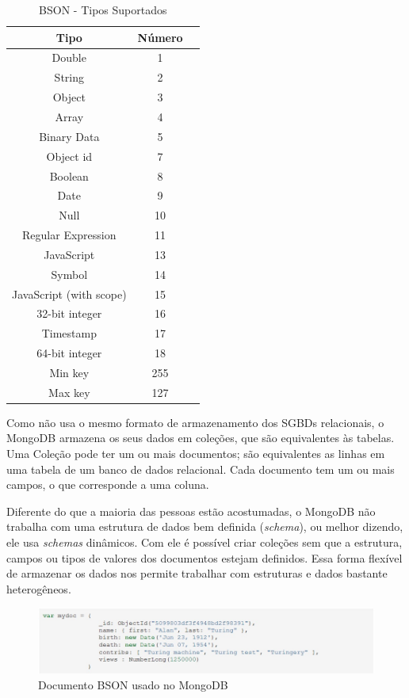 \begin{table}
	\caption{BSON - Tipos Suportados}
	\begin{center}
	\begin{tabular}{ccc}
		\hline
			\textbf{Tipo} & \textbf{Número} \\
		\hline
			Double & 1 \\
			String & 2 \\
			Object & 3 \\
			Array & 4 \\
			Binary Data & 5 \\
			Object id & 7 \\
			Boolean & 8 \\
			Date & 9 \\
			Null & 10 \\
			Regular Expression & 11 \\
			JavaScript & 13 \\
			Symbol & 14 \\
			JavaScript (with scope) & 15 \\
			32-bit integer & 16 \\
			Timestamp& 17 \\
			64-bit integer & 18 \\
			Min key & 255 \\
			Max key & 127 \\
		\hline
	\end {tabular}
	\end{center}
	\label{tab:bsontypes}
\end{table}

Como não usa o mesmo formato de armazenamento dos SGBDs relacionais, o MongoDB armazena os seus dados em coleções, que são equivalentes às tabelas.  Uma Coleção pode ter um ou mais documentos; são equivalentes as linhas em uma tabela de um banco de dados relacional. Cada documento tem um ou mais campos, o que corresponde a uma coluna.

Diferente do que a maioria das pessoas estão acostumadas, o MongoDB não trabalha com uma estrutura de dados bem definida (\textit{schema}), ou melhor dizendo, ele usa \textit{schemas} dinâmicos. Com ele é possível criar coleções sem que a estrutura, campos ou tipos de valores dos documentos estejam definidos. Essa forma flexível de armazenar os dados nos permite trabalhar com estruturas e dados bastante heterogêneos.

	\begin{figure}[!htbp]
		\begin{center}
			\includegraphics[width=1.2\textwidth]{exbson}
		\end{center}
		\caption{Documento BSON usado no MongoDB ~\cite{sitemongodb}}
		\label{fig:exbson}
	\end{figure}

